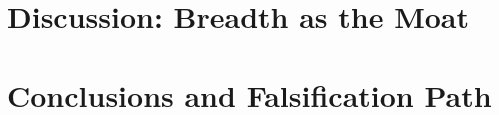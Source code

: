 \documentclass[conference]{IEEEtran}
\begin{document}
\section{Discussion: Breadth as the Moat}
\label{sec:moat}



\section{Conclusions and Falsification Path}
\label{sec:conc}



\end{document}
